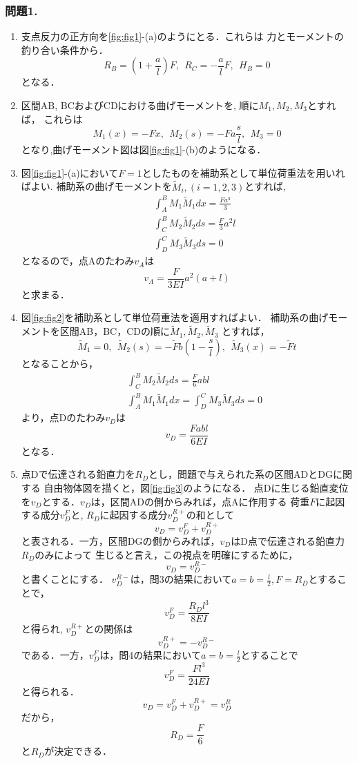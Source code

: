 \documentclass[10pt,a4j]{jarticle}
\begin{document}
\subsubsection*{問題1.}
\begin{enumerate}
\item
	支点反力の正方向を\ref{fig:fig1}-(a)のようにとる．これらは
	力とモーメントの釣り合い条件から．
	\[
		R_B=\left(1+\frac{a}{l}\right)F, \ \ R_C=-\frac{a}{l}F, \ \ H_B=0
	\]
	となる．
\item
	区間AB, BCおよびCDにおける曲げモーメントを, 順に$M_1,M_2,M_3$とすれば，
	これらは
	\[
		M_1(x)=-F x, \ \ M_2(s)=-Fa \frac{s}{l}, \ \ M_3=0
	\]
	となり,曲げモーメント図は図\ref{fig:fig1}-(b)のようになる．
\item
	図\ref{fig:fig1}-(a)において$F=1$としたものを補助系として単位荷重法を用いればよい.
	補助系の曲げモーメントを$\tilde M_i, (i=1,2,3)$とすれば, 
	\begin{eqnarray*}
	&& \int_A^B M_1\tilde M_1 dx=\frac{Fa^3}{3} \\  
		&& \int_C^B M_2 \tilde M_2 ds = \frac{F}{3}a^2l \\
	&& \int_D^C M_3 \tilde M_3 ds =0
	\end{eqnarray*}
	となるので，点Aのたわみ$v_A$は
	\[
		v_A= \frac{F}{3EI}a^2(a+l)
	\]
	と求まる．
\item
	図\ref{fig:fig2}を補助系として単位荷重法を適用すればよい．
	補助系の曲げモーメントを区間AB，BC，CDの順に$\tilde M_1, \tilde M_2, \tilde M_3$
	とすれば，
	\[
		\tilde M_1=0, \ \ 
		\tilde M_2(s)=-\tilde Fb \left(1-\frac{s}{l}\right), \ \ 
		\tilde M_3(x)=-\tilde{F} t
	\]
	となることから，
	\begin{eqnarray*}
		&& \int_C^B M_2\tilde M_2 ds=\frac{F}{6}abl\\  
	&& \int_A^BM_1 \tilde M_1dx=\int_D^C M_3 \tilde M_3 ds =0
	\end{eqnarray*}
	より，点Dのたわみ$v_D$は
	\[
		v_D=\frac{Fabl}{6EI}
	\]
	となる．
\item
	点Dで伝達される鉛直力を$R_D$とし，問題で与えられた系の区間ADとDGに関する
	自由物体図を描くと，図\ref{fig:fig3}のようになる．
	点Dに生じる鉛直変位を$v_D$とする．$v_D$は，区間ADの側からみれば，点Aに作用する
		荷重$F$に起因する成分$v_D^F$と, $R_D$に起因する成分$v_D^{R+}$の和として
	\[
		v_D=v_D^F+v_D^{R+}
	\]
	と表される．一方，区間DGの側からみれば，$v_D$はD点で伝達される鉛直力$R_D$のみによって
	生じると言え，この視点を明確にするために，
	\[
		v_D=v_D^{R-}
	\]
	と書くことにする．
	$v_D^{R-}$は，問3の結果において$a=b=\frac{l}{2}, F=R_D$とすることで，
	\[
		v_D^F=\frac{R_Dl^3}{8EI}
	\]
	と得られ, $v_D^{R+}$との関係は
	\[
		v_D^{R+}=-v_D^{R-}
	\]
	である．一方，$v_D^F$は，問4の結果において$a=b=\frac{l}{2}$とすることで
	\[
		v_D^F=\frac{Fl^3}{24EI}
		\]
	と得られる．
	\[
		v_D= v_D^F+v_D^{R+}=v_D^{R}
	\]
	だから，
	\[
		R_D=\frac{F}{6}
	\]
	と$R_D$が決定できる．
\end{enumerate}
\end{document}
